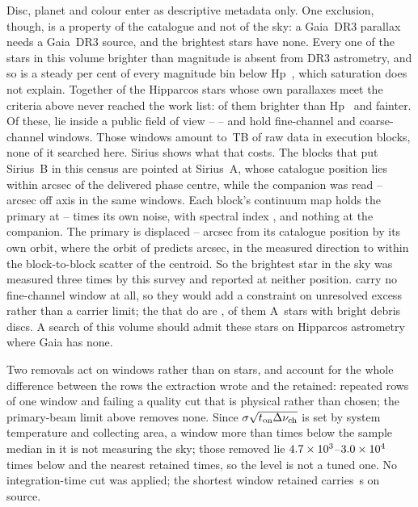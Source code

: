 Disc, planet and colour enter as descriptive metadata only. One exclusion,
though, is a property of the catalogue and not of the sky: a Gaia~DR3
parallax needs a Gaia~DR3 source, and the brightest stars have none. Every
one of the \BsNBright{} stars in this volume brighter than \BsBrightMag{}
magnitude is absent from DR3 astrometry, and so is a steady
\BsGapFaintPct{} per cent of every magnitude bin below Hp~\BsGapMagCut,
which saturation does not explain. Together \BsNGap{} of the \BsNVol{} Hipparcos stars whose own parallaxes
meet the criteria above never reached the work list: \BsGapNBright{} of them
brighter than Hp~\BsGapMagCut{} and \BsGapNFaint{} fainter. Of these,
\BsNAlmaWord{} lie inside a public field of view -- \BsStarList{} -- and
hold \BsNWinA{} fine-channel and \BsNWinB{} coarse-channel windows. Those
windows amount to \BsRawTB\,TB of raw data in \BsNEB{} execution blocks,
none of it searched here. Sirius shows what that costs. The \BsSirNEBWord{} blocks that put
Sirius~B in this census are pointed at Sirius~A, whose catalogue position lies
within \BsSirSepA{} arcsec of the delivered phase centre, while the companion
was read \BsSirOffLo--\BsSirOffHi{} arcsec off axis in the same
\BsSirNWin{} windows. Each block's continuum map holds the primary at
\BsSirSnrLo--\BsSirSnrHi{} times its own noise, with spectral index
\BsSirAlpha, and nothing at the companion. The primary is displaced
\BsSirCenLo--\BsSirCenHi{} arcsec from its catalogue position by its own
orbit, where the orbit of \citet{bond2017} predicts \OmSirPredArcsec{}
arcsec, in the measured direction to within the block-to-block scatter of the
centroid. So the brightest star in the sky was measured three times by this
survey and reported at neither position. \BsNoFineList{} carry no fine-channel
window at all, so they would add a constraint on unresolved excess rather
than a carrier limit; the \BsNFineWord{} that do are \BsFineList,
\BsNFineATypeWord{} of them A~stars with bright debris discs. A search of
this volume should admit these stars on Hipparcos astrometry where Gaia has
none.

Two removals act on windows rather than on stars, and account for the whole
difference between the
\LqNExport{} rows the extraction wrote and the \NWindows{} retained:
\NDup{} repeated rows of one window and
\NDefect{} failing a quality cut that is physical rather than chosen; the
primary-beam limit above removes none.
Since $\sigma\sqrt{t_{\rm on}\Delta\nu_{\rm ch}}$ is set by system
temperature and collecting area, a window more than \LqDefectCut{} times
below the sample median in it is not measuring the sky; those removed lie
$4.7\times10^{3}$--$3.0\times10^{4}$ times below and the nearest retained
\LqKeptFac{} times, so the level is not a tuned one. No integration-time cut
was applied; the shortest window retained carries \LqOnsrcMin\,s on source.

